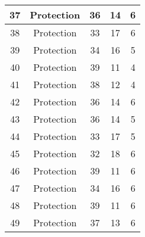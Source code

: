 \documentclass[results.tex]{subfiles}
\begin{document}
\begin{center}
\begin{tabular}{| c || c | c | c | c |}
            \hline
            37                      & Protection                   & 36                     & 14                      & 6                    \\
            \hline
            38                      & Protection                   & 33                     & 17                      & 6                    \\
            \hline
            39                      & Protection                   & 34                     & 16                      & 5                    \\
            \hline
            40                      & Protection                   & 39                     & 11                      & 4                    \\
            \hline
            41                      & Protection                   & 38                     & 12                      & 4                    \\
            \hline
            42                      & Protection                   & 36                     & 14                      & 6                    \\
            \hline
            43                      & Protection                   & 36                     & 14                      & 5                    \\
            \hline
            44                      & Protection                   & 33                     & 17                      & 5                    \\
            \hline
            45                      & Protection                   & 32                     & 18                      & 6                    \\
            \hline
            46                      & Protection                   & 39                     & 11                      & 6                    \\
            \hline
            47                      & Protection                   & 34                     & 16                      & 6                    \\
            \hline
            48                      & Protection                   & 39                     & 11                      & 6                    \\
            \hline
            49                      & Protection                   & 37                     & 13                      & 6                    \\
            \hline
        \end{tabular}
    \end{center}
\end{document}
